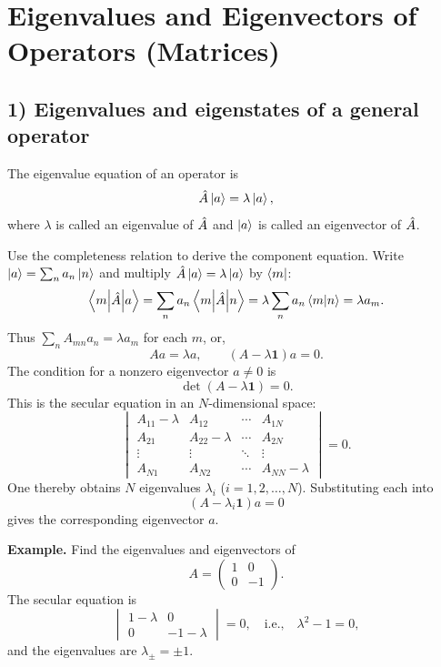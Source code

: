 \section{Eigenvalues and Eigenvectors of Operators (Matrices)}
\subsection*{1) Eigenvalues and eigenstates of a general operator}
The eigenvalue equation of an operator is
\begin{equation}
\hat{A}\left|a\right\rangle=\lambda\left|a\right\rangle,
\end{equation}
where $\lambda$ is called an eigenvalue of $\hat{A}$ and $\left|a\right\rangle$ is called an eigenvector of $\hat{A}$.

Use the completeness relation to derive the component equation. Write
$\left|a\right\rangle=\sum_n a_n\left|n\right\rangle$ and multiply $\hat{A}\left|a\right\rangle=\lambda\left|a\right\rangle$
by $\left\langle m\right|$:
\begin{equation}
\left\langle m\middle|\hat{A}\middle|a\right\rangle=\sum_n a_n\left\langle m\middle|\hat{A}\middle|n\right\rangle
=\lambda\sum_n a_n\left\langle m\middle|n\right\rangle=\lambda a_m.
\end{equation}
Thus $\sum_n A_{mn}a_n=\lambda a_m$ for each $m$, or,
\begin{equation}
Aa=\lambda a,\qquad (A-\lambda\mathbf1)a=0.
\end{equation}
The condition for a nonzero eigenvector $a\ne0$ is
\begin{equation}
\det(A-\lambda\mathbf1)=0.
\end{equation}
This is the secular equation in an $N$-dimensional space:
\begin{equation}
\begin{vmatrix}
A_{11}-\lambda&A_{12}&\cdots&A_{1N}\\
A_{21}&A_{22}-\lambda&\cdots&A_{2N}\\
\vdots&\vdots&\ddots&\vdots\\
A_{N1}&A_{N2}&\cdots&A_{NN}-\lambda
\end{vmatrix}=0.
\end{equation}
One thereby obtains $N$ eigenvalues $\lambda_i$ ($i=1,2,\ldots,N$). Substituting each into
\begin{equation}
(A-\lambda_i\mathbf1)a=0
\end{equation}
gives the corresponding eigenvector $a$.

\textbf{Example.} Find the eigenvalues and eigenvectors of
\begin{equation}
A=\begin{pmatrix}1&0\\0&-1\end{pmatrix}.
\end{equation}
The secular equation is
\begin{equation}
\begin{vmatrix}1-\lambda&0\\0&-1-\lambda\end{vmatrix}=0,
\quad\text{i.e.,}\quad \lambda^2-1=0,
\end{equation}
and the eigenvalues are $\lambda_\pm=\pm1$.

